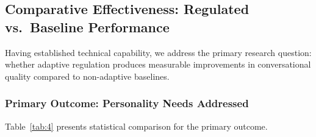 \documentclass[apajournal,article,submit,moreauthors]{Definitions/mdpi}
\begin{document}
\subsection{Comparative Effectiveness: Regulated vs.~Baseline Performance}\label{comparative-effectiveness-regulated-vs-baseline-performance}

Having established technical capability, we address the primary research question: whether adaptive regulation produces measurable improvements in conversational quality compared to non-adaptive baselines.

\subsubsection{Primary Outcome: Personality Needs Addressed}\label{primary-outcome-personality-needs-addressed}

Table~\ref{tab:4} presents statistical comparison for the primary outcome.
\end{document}
